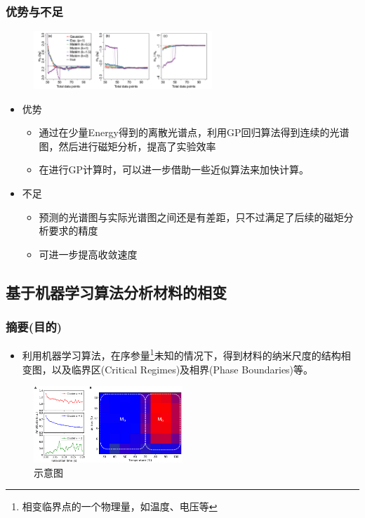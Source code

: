 \documentclass{beamer}
\begin{document}
\begin{frame}
\frametitle{优势与不足}
\begin{figure}
\centering
\includegraphics[width=0.6\textwidth]{Materials/Results1.png}
\end{figure}

\begin{itemize}
\item 优势
\begin{itemize}
\item 通过在少量Energy得到的离散光谱点，利用GP回归算法得到连续的光谱图，然后进行磁矩分析，提高了实验效率
\item 在进行GP计算时，可以进一步借助一些近似算法来加快计算。
\end{itemize}
\item 不足
\begin{itemize}
\item 预测的光谱图与实际光谱图之间还是有差距，只不过满足了后续的磁矩分析要求的精度
\item 可进一步提高收敛速度
\end{itemize}
\end{itemize}

\end{frame}

\subsection{基于机器学习算法分析材料的相变}

\begin{frame}
\tableofcontents[
sectionstyle=show/show,
subsectionstyle=show/share/hide,
currentsubsection,
]
\end{frame}

\begin{frame}
\frametitle{摘要(目的)}
\begin{itemize}
\item 利用机器学习算法，在序参量\footnote{相变临界点的一个物理量，如温度、电压等}未知的情况下，得到材料的纳米尺度的结构相变图，以及临界区(Critical Regimes)及相界(Phase Boundaries)等。
\end{itemize}
\begin{figure}[!b]
\centering
\includegraphics[width=0.5\textwidth]{Materials/Phase1.png}
\caption{示意图}
\end{figure}
\end{frame}
\end{document}
